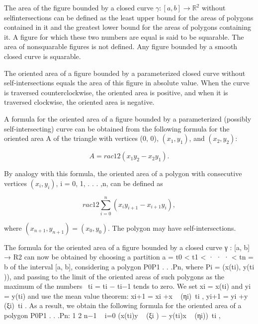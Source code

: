 \documentclass[a4paper,10pt]{article}
\begin{document}
The area of the figure bounded by a closed curve $γ : [a, b] → \mathbb{R}^2$ without selfintersections can be defined as the least upper bound for the areas of polygons contained in it and the greatest lower bound for the areas of polygons containing it. A figure for which these two numbers are equal is said to be squarable. The area of nonsquarable figures is not defined.
Any figure bounded by a smooth closed curve is squarable.

The oriented area of a figure bounded by a parameterized closed curve without self-intersections equals the area of this figure in absolute value. When the curve is traversed counterclockwise, the oriented area is positive, and when it is traversed clockwise, the oriented area is negative.

A formula for the oriented area of a figure bounded by a parameterized (possibly self-intersecting) curve can be obtained from the following formula for the oriented area A of the triangle with vertices (0, 0), $(x_1, y_1)$, and $(x_2, y_2)$:

$$
A = rac{1}{2}(x_1y_2 − x_2y_1).
$$

By analogy with this formula, the oriented area of a polygon with consecutive vertices $(x_i, y_i)$, i = 0, 1, . . . ,n, can be defined as

$$
rac{1}{2} \sum^n_{i=0}(x_iy_{i+1} − x_{i+1}y_i),
$$

where $(x_{n+1}, y_{n+1}) = (x_0, y_0)$. The polygon may have self-intersections.

The formula for the oriented area of a figure bounded by a closed curve
γ : [a, b] → R2 can now be obtained by choosing a partition a = t0 < t1 <
· · · < tn = b of the interval [a, b], considering a polygon P0P1 . . .Pn, where
Pi = (x(ti), y(ti )), and passing to the limit of the oriented areas of such polygons
as the maximum of the numbers  ti = ti − ti−1 tends to zero.
We set xi = x(ti) and yi = y(ti) and use the mean value theorem: xi+1 =
xi +x
 
(ηi) ti , yi+1 = yi +y
 
(ξi) ti . As a result, we obtain the following formula
for the oriented area of a polygon P0P1 . . .Pn:
1
2
n−1
 
i=0
(x(ti)y
 
(ξi ) − y(ti)x
 
(ηi)) ti ,
\end{document}

